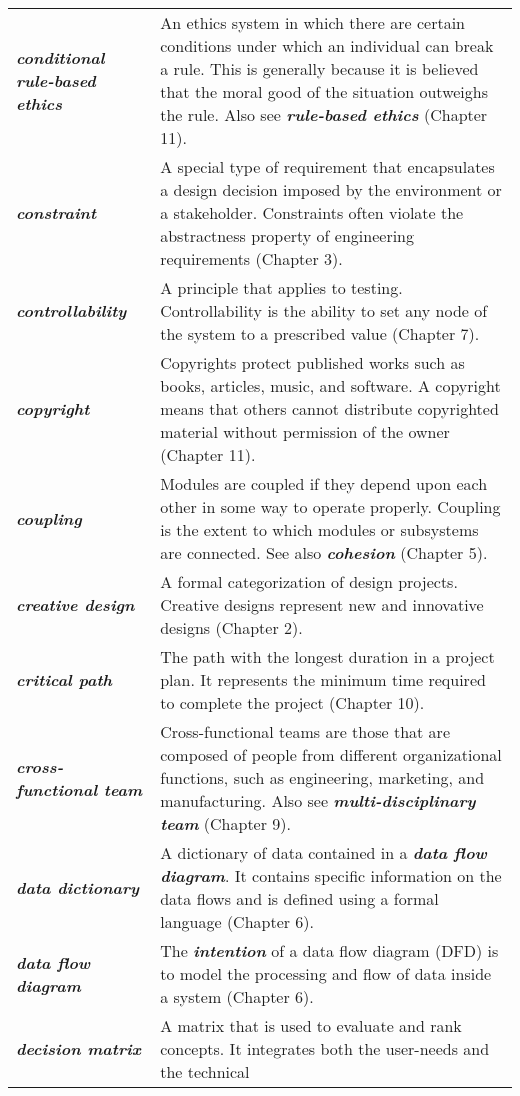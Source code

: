 \begin{longtable} { p{4cm} p{11cm}}
\emph{\textbf{conditional rule-based ethics}} & An ethics system in
which there are certain conditions under which an individual can break a
rule. This is generally because it is believed that the moral good of
the situation outweighs the rule. Also see \emph{\textbf{rule-based
ethics}} (Chapter 11). \\
\emph{\textbf{constraint}} & A special type of requirement that
encapsulates a design decision imposed by the environment or a
stakeholder. Constraints often violate the abstractness property of
engineering requirements (Chapter 3). \\
\emph{\textbf{controllability}} & A principle that applies to testing.
Controllability is the ability to set any node of the system to a
prescribed value (Chapter 7). \\
\emph{\textbf{copyright}} & Copyrights protect published works such as
books, articles, music, and software. A copyright means that others
cannot distribute copyrighted material without permission of the owner
(Chapter 11). \\
\emph{\textbf{coupling}} & Modules are coupled if they depend upon each
other in some way to operate properly. Coupling is the extent to which
modules or subsystems are connected. See also \emph{\textbf{cohesion}}
(Chapter 5). \\
\emph{\textbf{creative design}} & A formal categorization of design
projects. Creative designs represent new and innovative designs (Chapter
2). \\
\emph{\textbf{critical path}} & The path with the longest duration in a
project plan. It represents the minimum time required to complete the
project (Chapter 10). \\
\emph{\textbf{cross-functional team}} & Cross-functional teams are those
that are composed of people from different organizational functions,
such as engineering, marketing, and manufacturing. Also see
\emph{\textbf{multi-disciplinary team}} (Chapter 9). \\
\emph{\textbf{data dictionary}} & A dictionary of data contained in a
\emph{\textbf{data flow diagram}}. It contains specific information on
the data flows and is defined using a formal language (Chapter 6). \\
\emph{\textbf{data flow diagram}} & The \emph{\textbf{intention}} of a
data flow diagram (DFD) is to model the processing and flow of data
inside a system (Chapter 6). \\
\emph{\textbf{decision matrix}} & A matrix that is used to evaluate and
rank concepts. It integrates both the user-needs and the technical

\end{longtable}
